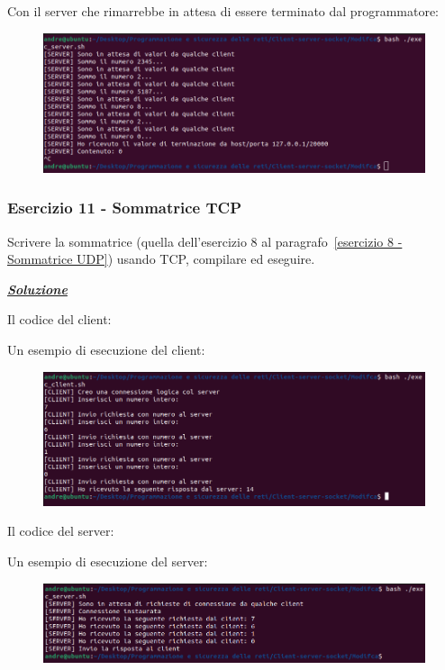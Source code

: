 \documentclass[a4paper]{article}
\begin{document}
	\noindent
	Con il server che rimarrebbe in attesa di essere terminato dal programmatore:
	\begin{figure}[!htp]
		\centering
		\includegraphics[width=\textwidth]{img/soluzioni_TCP-UDP/TCP-UDP_8.png}
	\end{figure}\newpage

	\subsubsection{Esercizio 11 - Sommatrice TCP}
	
	Scrivere la sommatrice (quella dell'esercizio 8 al paragrafo~\ref{esercizio 8 - Sommatrice UDP}) usando TCP, compilare ed eseguire.\newline
	
	\noindent
	\textcolor{Green4}{\textbf{\emph{\underline{Soluzione}}}}\newline
	
	\noindent
	Il codice del client:
	
	Un esempio di esecuzione del client:
	\begin{figure}[!htp]
		\centering
		\includegraphics[width=\textwidth]{img/soluzioni_TCP-UDP/TCP-UDP_9.png}
	\end{figure}\newpage

	\noindent
	Il codice del server:
	
	Un esempio di esecuzione del server:
	\begin{figure}[!htp]
		\centering
		\includegraphics[width=\textwidth]{img/soluzioni_TCP-UDP/TCP-UDP_10.png}
	\end{figure}\newpage
\end{document}
